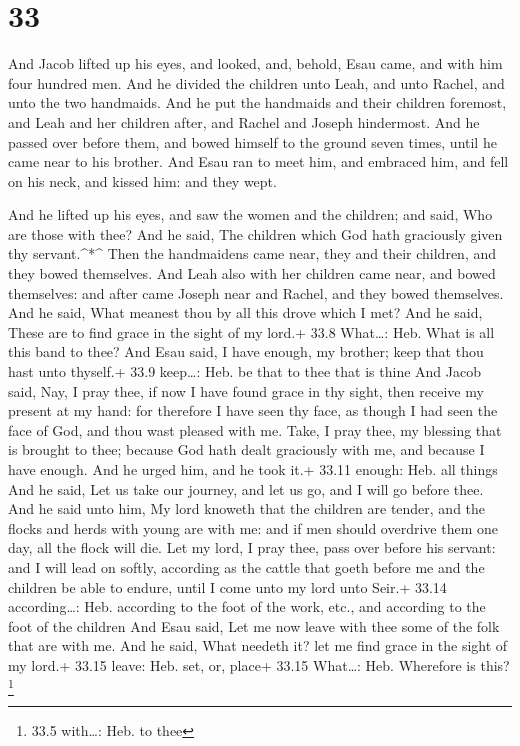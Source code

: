 \hypertarget{section-32}{%
\section{33}\label{section-32}}

 And Jacob lifted up his eyes, and looked, and, behold, Esau
came, and with him four hundred men. And he divided the children unto
Leah, and unto Rachel, and unto the two handmaids.  And he
put the handmaids and their children foremost, and Leah and her children
after, and Rachel and Joseph hindermost.  And he passed over
before them, and bowed himself to the ground seven times, until he came
near to his brother.  And Esau ran to meet him, and embraced
him, and fell on his neck, and kissed him: and they wept.

 And he lifted up his eyes, and saw the women and the
children; and said, Who are those with thee? And he said, The children
which God hath graciously given thy servant.\^{}*\^{}  Then
the handmaidens came near, they and their children, and they bowed
themselves.  And Leah also with her children came near, and
bowed themselves: and after came Joseph near and Rachel, and they bowed
themselves.  And he said, What meanest thou by all this
drove which I met? And he said, These are to find grace in the sight of
my lord.+ 33.8 What\ldots: Heb. What is all this band to thee?
 And Esau said, I have enough, my brother; keep that thou
hast unto thyself.+ 33.9 keep\ldots: Heb. be that to thee that is thine
 And Jacob said, Nay, I pray thee, if now I have found
grace in thy sight, then receive my present at my hand: for therefore I
have seen thy face, as though I had seen the face of God, and thou wast
pleased with me.  Take, I pray thee, my blessing that is
brought to thee; because God hath dealt graciously with me, and because
I have enough. And he urged him, and he took it.+ 33.11 enough: Heb. all
things  And he said, Let us take our journey, and let us
go, and I will go before thee.  And he said unto him, My
lord knoweth that the children are tender, and the flocks and herds with
young are with me: and if men should overdrive them one day, all the
flock will die.  Let my lord, I pray thee, pass over before
his servant: and I will lead on softly, according as the cattle that
goeth before me and the children be able to endure, until I come unto my
lord unto Seir.+ 33.14 according\ldots: Heb. according to the foot of
the work, etc., and according to the foot of the children 
And Esau said, Let me now leave with thee some of the folk that are with
me. And he said, What needeth it? let me find grace in the sight of my
lord.+ 33.15 leave: Heb. set, or, place+ 33.15 What\ldots: Heb.
Wherefore is this? \footnote{33.5 with\ldots: Heb. to thee}

